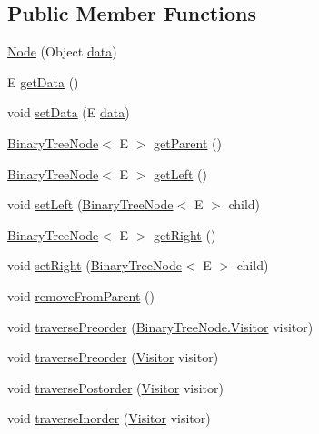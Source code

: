 \subsection*{Public Member Functions}
\begin{DoxyCompactItemize}
\item 
\hyperlink{class_red_black_tree_1_1_node_ab40eafdb442df2361dc34aab89537121}{Node} (Object \hyperlink{class_linked_binary_tree_node_a9022368f5ebb23585ce2b00cdc27e505}{data})
\item 
E \hyperlink{class_linked_binary_tree_node_a7c2f77ce2d6b5b56854f3e21229cf7be}{get\+Data} ()
\item 
void \hyperlink{class_linked_binary_tree_node_ada54f092b78cc359f1ba41a3ac02ab80}{set\+Data} (E \hyperlink{class_linked_binary_tree_node_a9022368f5ebb23585ce2b00cdc27e505}{data})
\item 
\hyperlink{interface_binary_tree_node}{Binary\+Tree\+Node}$<$ E $>$ \hyperlink{class_linked_binary_tree_node_a67681eb2b9d5aa1522fe7f5ad0a43435}{get\+Parent} ()
\item 
\hyperlink{interface_binary_tree_node}{Binary\+Tree\+Node}$<$ E $>$ \hyperlink{class_linked_binary_tree_node_aff92f2fe5a957710d6510efba6c12a24}{get\+Left} ()
\item 
void \hyperlink{class_linked_binary_tree_node_ad99561d122c83c710d2e16acf6a78016}{set\+Left} (\hyperlink{interface_binary_tree_node}{Binary\+Tree\+Node}$<$ E $>$ child)
\item 
\hyperlink{interface_binary_tree_node}{Binary\+Tree\+Node}$<$ E $>$ \hyperlink{class_linked_binary_tree_node_a0d0979d4274a78b5e50cc67bbe67f6dd}{get\+Right} ()
\item 
void \hyperlink{class_linked_binary_tree_node_acf93e554937b4465b206145c2ad3cc25}{set\+Right} (\hyperlink{interface_binary_tree_node}{Binary\+Tree\+Node}$<$ E $>$ child)
\item 
void \hyperlink{class_linked_binary_tree_node_a8ad111432e731268c2a2f2b60b716c3c}{remove\+From\+Parent} ()
\item 
void \hyperlink{class_linked_binary_tree_node_afe88e26d8e1a35a9f9cfb885aa4cf7eb}{traverse\+Preorder} (\hyperlink{interface_binary_tree_node_1_1_visitor}{Binary\+Tree\+Node.\+Visitor} visitor)
\item 
void \hyperlink{interface_binary_tree_node_a663a53b5d44f02f42c62aa8adaee09a1}{traverse\+Preorder} (\hyperlink{interface_binary_tree_node_1_1_visitor}{Visitor} visitor)
\item 
void \hyperlink{class_linked_binary_tree_node_ae0280ad10046815632a7f41f4fbfc7c4}{traverse\+Postorder} (\hyperlink{interface_binary_tree_node_1_1_visitor}{Visitor} visitor)
\item 
void \hyperlink{class_linked_binary_tree_node_a7e0193ab373cea38b1144f0d13618e2e}{traverse\+Inorder} (\hyperlink{interface_binary_tree_node_1_1_visitor}{Visitor} visitor)
\end{DoxyCompactItemize}

